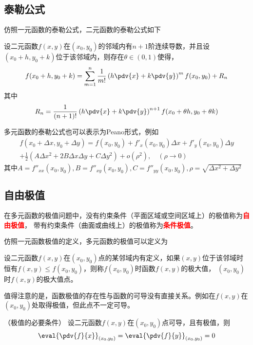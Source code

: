 \subsection{泰勒公式}
仿照一元函数的泰勒公式，二元函数的泰勒公式如下
\begin{theorem}
    设二元函数$f(x,y)$在$(x_0,y_0)$的邻域内有$n+1$阶连续导数，并且设$(x_0+h,y_0+k)$位于该邻域内，则存在$\theta\in(0,1)$使得，
    \[
        f(x_0+h,y_0+k) = \sum_{m=1}^n \frac{1}{m!}\left(h\pdv{x} + k\pdv{y}\right)^mf(x_0,y_0) + R_n
    \]
    其中
    \[
        R_n = \frac{1}{(n+1)!}\left(h\pdv{x} + k\pdv{y}\right)^{n+1}f(x_0+\theta h,y_0 +\theta k)
    \]

    多元函数的泰勒公式也可以表示为Peano形式，例如
    \begin{equation}
        \begin{split}
            f(x_0+\Delta x, y_0 + \Delta y) = f(x_0,y_0) + f'_x(x_0,y_0)\Delta x + f'_y(x_0,y_0)\Delta y \\
            + \frac{1}{2}\left(A\Delta x^2 + 2B\Delta x\Delta y + C\Delta y^2\right) + o(\rho^2),\quad (\rho\to 0)
        \end{split}
    \end{equation}
    其中$A=f''_{xx}(x_0,y_0),B=f''_{xy}(x_0,y_0),C=f''_{yy}(x_0,y_0),\rho=\sqrt{\Delta x^2 + \Delta y^2}$
\end{theorem}

\subsection{自由极值}
在多元函数的极值问题中，没有约束条件（平面区域或空间区域上）的极值称为\textcolor{red}{\textbf{\textsf{自由极值}}}，
带有约束条件（曲面或曲线上）的极值称为\textcolor{red}{\textbf{\textsf{条件极值}}}。

仿照一元函数极值的定义，多元函数的极值可以定义为
\begin{definition}
    设二元函数$f(x,y)$在$(x_0,y_0)$点的某邻域内有定义，如果$(x,y)$位于该邻域时恒有$f(x,y)\leq f(x_0,y_0)$，则称$f(x_0,y_0)$时函数$f(x,y)$的极大值，
    $(x_0,y_0)$时$f(x,y)$的极大值点。
\end{definition}

值得注意的是，函数极值的存在性与函数的可导没有直接关系。例如在$f(x,y)$在$(x_0,y_0)$处取得极值，但此点不一定可导。

\begin{theorem}
    （极值的必要条件）
    设二元函数$f(x,y)$在$(x_0,y_0)$点可导，且有极值，则
    \[ \eval{\pdv{f}{x}}_{(x_0, y_0)} = \eval{\pdv{f}{y}}_{(x_0, y_0)} = 0 \]
\end{theorem}


